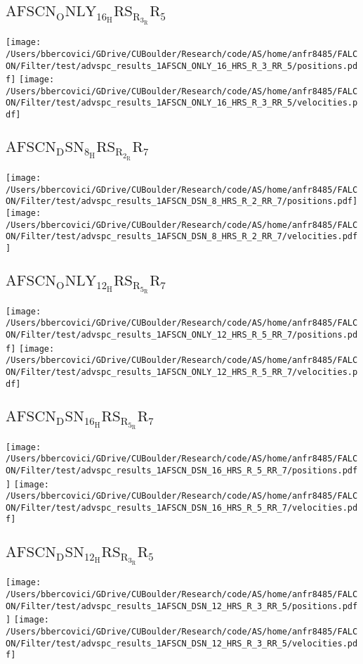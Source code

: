 \subsection{$\mathrm{AFSCN_ONLY_16_HRS_R_3_RR_5}$}
\texttt{[image: /Users/bbercovici/GDrive/CUBoulder/Research/code/AS/home/anfr8485/FALCON/Filter/test/advspc\_results\_1AFSCN\_ONLY\_16\_HRS\_R\_3\_RR\_5/positions.pdf]}
\texttt{[image: /Users/bbercovici/GDrive/CUBoulder/Research/code/AS/home/anfr8485/FALCON/Filter/test/advspc\_results\_1AFSCN\_ONLY\_16\_HRS\_R\_3\_RR\_5/velocities.pdf]}
\subsection{$\mathrm{AFSCN_DSN_8_HRS_R_2_RR_7}$}
\texttt{[image: /Users/bbercovici/GDrive/CUBoulder/Research/code/AS/home/anfr8485/FALCON/Filter/test/advspc\_results\_1AFSCN\_DSN\_8\_HRS\_R\_2\_RR\_7/positions.pdf]}
\texttt{[image: /Users/bbercovici/GDrive/CUBoulder/Research/code/AS/home/anfr8485/FALCON/Filter/test/advspc\_results\_1AFSCN\_DSN\_8\_HRS\_R\_2\_RR\_7/velocities.pdf]}
\subsection{$\mathrm{AFSCN_ONLY_12_HRS_R_5_RR_7}$}
\texttt{[image: /Users/bbercovici/GDrive/CUBoulder/Research/code/AS/home/anfr8485/FALCON/Filter/test/advspc\_results\_1AFSCN\_ONLY\_12\_HRS\_R\_5\_RR\_7/positions.pdf]}
\texttt{[image: /Users/bbercovici/GDrive/CUBoulder/Research/code/AS/home/anfr8485/FALCON/Filter/test/advspc\_results\_1AFSCN\_ONLY\_12\_HRS\_R\_5\_RR\_7/velocities.pdf]}
\subsection{$\mathrm{AFSCN_DSN_16_HRS_R_5_RR_7}$}
\texttt{[image: /Users/bbercovici/GDrive/CUBoulder/Research/code/AS/home/anfr8485/FALCON/Filter/test/advspc\_results\_1AFSCN\_DSN\_16\_HRS\_R\_5\_RR\_7/positions.pdf]}
\texttt{[image: /Users/bbercovici/GDrive/CUBoulder/Research/code/AS/home/anfr8485/FALCON/Filter/test/advspc\_results\_1AFSCN\_DSN\_16\_HRS\_R\_5\_RR\_7/velocities.pdf]}
\subsection{$\mathrm{AFSCN_DSN_12_HRS_R_3_RR_5}$}
\texttt{[image: /Users/bbercovici/GDrive/CUBoulder/Research/code/AS/home/anfr8485/FALCON/Filter/test/advspc\_results\_1AFSCN\_DSN\_12\_HRS\_R\_3\_RR\_5/positions.pdf]}
\texttt{[image: /Users/bbercovici/GDrive/CUBoulder/Research/code/AS/home/anfr8485/FALCON/Filter/test/advspc\_results\_1AFSCN\_DSN\_12\_HRS\_R\_3\_RR\_5/velocities.pdf]}
